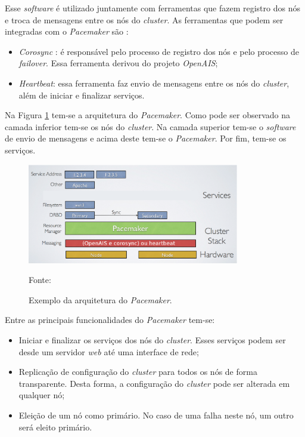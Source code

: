 Esse \textit{software} é utilizado juntamente com ferramentas que fazem registro dos nós e troca de mensagens entre os nós do \textit{cluster}.
As ferramentas que podem ser integradas com o \textit{Pacemaker} são \cite{pacemaker}:
\begin{itemize}
 \item \textit{Corosync} \cite{corosync}: é responsável pelo processo de registro dos nós e pelo processo de \textit{failover}.
 Essa ferramenta derivou do projeto \textit{OpenAIS};
 \item \textit{Heartbeat}: essa ferramenta faz envio de mensagens entre os nós do \textit{cluster}, além de iniciar e finalizar serviços.
\end{itemize}


Na Figura \ref{fig:pacemaker_tools} tem-se a arquitetura do \textit{Pacemaker}. Como pode ser observado na camada inferior tem-se os nós do 
\textit{cluster}. Na camada superior tem-se o \textit{software} de envio de mensagens e acima deste tem-se o \textit{Pacemaker}. 
Por fim, tem-se os serviços.

\begin{figure}[h!]
 \centering
 \includegraphics[width=350px]{img/pacemaker_tools.eps}
 \caption{Exemplo da arquitetura do \textit{Pacemaker}.}
 Fonte: \citet{pacemaker}
 \label{fig:pacemaker_tools}
\end{figure}

Entre as principais funcionalidades do \textit{Pacemaker} tem-se:
\begin{itemize}
 \item Iniciar e finalizar os serviços dos nós do \textit{cluster}. Esses serviços podem ser desde um servidor \textit{web} até uma interface de 
 rede;
 \item Replicação de configuração do \textit{cluster} para todos os nós de forma transparente. Desta forma, a configuração do \textit{cluster} 
 pode ser alterada em qualquer nó;
 \item Eleição de um nó como primário. No caso de uma falha neste nó, um outro será eleito primário.
\end{itemize}

